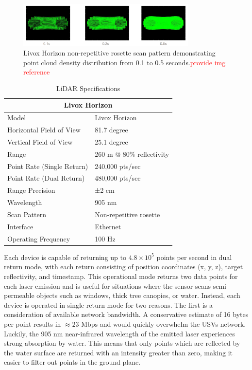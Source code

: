 \documentclass{erauthesis}
\begin{document}
\begin{figure}[htbp]
\centering
\includegraphics[width=0.8\textwidth]{Images/Livox_1.png}
\caption{Livox Horizon non-repetitive rosette scan pattern demonstrating point cloud density distribution from 0.1 to 0.5 seconds.\textcolor{red}{provide img reference}}
\label{fig:livox_scan_pattern}
\end{figure}

\begin{table}[htpb]
\centering
\caption{LiDAR Specifications}
\begin{tabular}{ll}
\hline
\multicolumn{2}{c}{Livox Horizon}\\
\hline
\hline
Model & Livox Horizon \\
Horizontal Field of View & 81.7 degree \\
Vertical Field of View & 25.1 degree \\
Range & 260 m @ 80\% reflectivity \\
Point Rate (Single Return) & 240,000 pts/sec \\
Point Rate (Dual Return) & 480,000 pts/sec \\
Range Precision & ±2 cm \\
Wavelength & 905 nm \\
Scan Pattern & Non-repetitive rosette \\
Interface & Ethernet \\
Operating Frequency & 100 Hz \\
\hline
\end{tabular}
\label{table:livox_horizon_specs}
\end{table}

Each device is capable of returning up to $4.8 \times 10^5$ points per second in dual return mode, with each return consisting of position coordinates (x, y, z), target reflectivity, and timestamp.
This operational mode returns two data points for each laser emission and is useful for situations where the sensor scans semi-permeable objects such as windows, thick tree canopies, or water.
Instead, each device is operated in single-return mode for two reasons.
The first is a consideration of available network bandwidth.
A conservative estimate of 16 bytes per point results in $\approx 23 \text{ Mbps}$ and would quickly overwhelm the \acp{USV} network.
Luckily, the 905 nm near-infrared wavelength of the emitted laser experiences strong absorption by water. 
This means that only points which are reflected by the water surface are returned with an intensity greater than zero, making it easier to filter out points in the ground plane.
\end{document}
